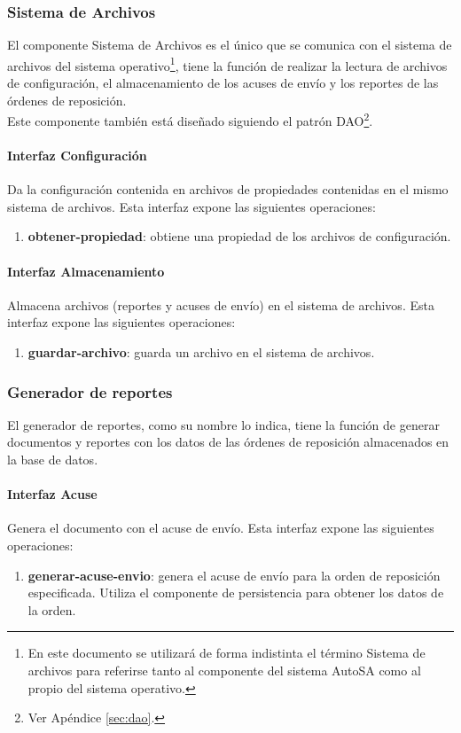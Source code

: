 \subsubsection{Sistema de Archivos}
El componente Sistema de Archivos es el único que se comunica con el sistema de archivos del sistema operativo\footnote{En este documento se utilizará de forma indistinta el término Sistema de archivos para referirse tanto al componente del sistema AutoSA como al propio del sistema operativo.}, tiene la función de realizar la lectura de archivos de configuración, el almacenamiento de los acuses de envío  y los reportes de las órdenes de reposición.\\
Este componente también está diseñado siguiendo el patrón DAO\footnote{Ver Apéndice \ref{sec:dao}.}.
\paragraph{\indent Interfaz Configuración\\}
Da la configuración contenida en archivos de propiedades contenidas en el mismo sistema de archivos. Esta interfaz expone las siguientes operaciones:

\begin{enumerate}
	\item \textbf{obtener-propiedad}: obtiene una propiedad de los archivos de configuración.
\end{enumerate}

\paragraph{\indent Interfaz Almacenamiento\\}
Almacena archivos (reportes y acuses de envío) en el sistema de archivos. Esta interfaz expone las siguientes operaciones:
\begin{enumerate}
	\item \textbf{guardar-archivo}: guarda un archivo en el sistema de archivos.
\end{enumerate}

\subsubsection{Generador de reportes}
El generador de reportes, como su nombre lo indica, tiene la función de generar documentos y reportes con los datos de las órdenes de reposición almacenados en la base de datos. 
\paragraph{\indent Interfaz Acuse\\} Genera el documento con el acuse de envío. Esta interfaz expone las siguientes operaciones:
\begin{enumerate}
	\item \textbf{generar-acuse-envio}: genera el acuse de envío para la orden de reposición especificada. Utiliza el componente de persistencia para obtener los datos de la orden.
\end{enumerate}

